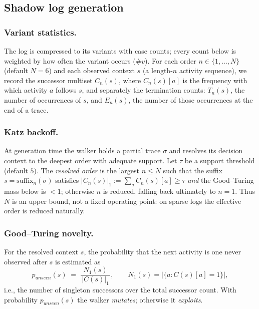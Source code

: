 \documentclass[runningheads]{llncs}
\newcommand{\punseen}{\ensuremath{p_{\mathit{unseen}}}}
\begin{document}
\subsection{Shadow log generation}
\label{sec:method:gen}

\subsubsection{Variant statistics.}
The log is compressed to its variants with case counts; every count below is weighted by how often the variant occurs ($\#v$). For each order $n\in\{1,\dots,N\}$ (default $N{=}6$) and each observed context $s$ (a length-$n$ activity sequence), we record the successor multiset $C_n(s)$, where $C_n(s)[a]$ is the frequency with which activity $a$ follows $s$, and separately the termination counts: $T_n(s)$, the number of occurrences of $s$, and $E_n(s)$, the number of those occurrences at the end of a trace.

\subsubsection{Katz backoff.}
At generation time the walker holds a partial trace $\sigma$ and resolves its decision context to the deepest order with adequate support. Let $\tau$ be a support threshold (default $5$). The \emph{resolved order} is the largest $n\le N$ such that the suffix $s=\mathrm{suffix}_n(\sigma)$ satisfies $|C_n(s)|_1 := \sum_a C_n(s)[a] \ge \tau$ \emph{and} the Good--Turing mass below is $<1$; otherwise $n$ is reduced, falling back ultimately to $n{=}1$. Thus $N$ is an upper bound, not a fixed operating point: on sparse logs the effective order is reduced naturally.

\subsubsection{Good--Turing novelty.}
For the resolved context $s$, the probability that the next activity is one never observed after $s$ is estimated as
\begin{equation}
\punseen(s) \;=\; \frac{N_1(s)}{\,|C(s)|_1\,}, \qquad N_1(s) = |\{a : C(s)[a]=1\}|,
\label{eq:gt}
\end{equation}
i.e., the number of singleton successors over the total successor count. With probability $\punseen(s)$ the walker \emph{mutates}; otherwise it \emph{exploits}.
\end{document}
